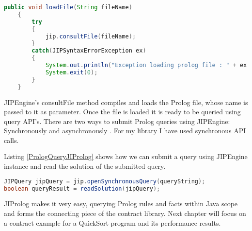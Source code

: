 \begin{minipage}{\linewidth}       
\begin{lstlisting}[frame=single, language=Java,caption={Loading a Prolog file using JIProlog API}, label={CodeSnippet}, captionpos=b, breaklines=true, showstringspaces=false]
public void loadFile(String fileName)
	{
		try
		{
			jip.consultFile(fileName);
		}
		catch(JIPSyntaxErrorException ex)
		{
			System.out.println("Exception loading prolog file : " + ex.getMessage());
			System.exit(0);
		}
	}
\end{lstlisting}
\end{minipage}

JIPEngine's consultFile method compiles and loads the Prolog file, whose name is passed to it as parameter. Once the file is loaded it is ready to be queried using query API's. There are two ways to submit Prolog queries using JIPEngine: Synchronously and asynchronously \cite{JIProlog}. For my library I have used synchronous API calls. 

\begin{minipage}{\linewidth}
Listing \ref{PrologQueryJIProlog} shows how we can submit a query using JIPEngine instance and read the solution of the submitted query.
      
\begin{lstlisting}[frame=single, language=Java, caption={Prolog Query Using JIProlog API}, label={PrologQueryJIProlog}, captionpos=b, breaklines=true, showstringspaces=false]
JIPQuery jipQuery = jip.openSynchronousQuery(queryString);
boolean queryResult = readSolution(jipQuery);
\end{lstlisting}
\end{minipage}

JIProlog makes it very easy, querying Prolog rules and facts within Java scope and forms the connecting piece of the contract library. Next chapter will focus on a contract example for a QuickSort program and its performance results.

 